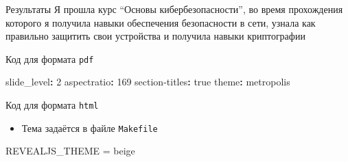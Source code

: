\documentclass[
  ignorenonframetext,
  aspectratio=169,
]{beamer}
\newenvironment{Shaded}{\begin{snugshade}}{\end{snugshade}}
\newcommand{\AttributeTok}[1]{\textcolor[rgb]{0.40,0.45,0.13}{#1}}
\newcommand{\CharTok}[1]{\textcolor[rgb]{0.13,0.47,0.30}{#1}}
\newcommand{\DecValTok}[1]{\textcolor[rgb]{0.68,0.00,0.00}{#1}}
\newcommand{\FunctionTok}[1]{\textcolor[rgb]{0.28,0.35,0.67}{#1}}
\newcommand{\KeywordTok}[1]{\textcolor[rgb]{0.00,0.23,0.31}{\textbf{#1}}}
\newcommand{\NormalTok}[1]{\textcolor[rgb]{0.00,0.23,0.31}{#1}}
\providecommand{\tightlist}{%
  \setlength{\itemsep}{0pt}\setlength{\parskip}{0pt}}\usepackage{longtable,booktabs,array}
\begin{document}
\begin{frame}{Результаты}
\label{ux440ux435ux437ux443ux43bux44cux442ux430ux442ux44b}
Я прошла курс \enquote{Основы кибербезопасности}, во время прохождения
которого я получила навыки обеспечения безопасности в сети, узнала как
правильно защитить свои устройства и получила навыки криптографии
\end{frame}

\begin{frame}[fragile]{Код для формата \texttt{pdf}}
\label{ux43aux43eux434-ux434ux43bux44f-ux444ux43eux440ux43cux430ux442ux430-pdf}
\begin{Shaded}
\begin{Highlighting}[]
\FunctionTok{slide\_level}\KeywordTok{:}\AttributeTok{ }\DecValTok{2}
\FunctionTok{aspectratio}\KeywordTok{:}\AttributeTok{ }\DecValTok{169}
\FunctionTok{section{-}titles}\KeywordTok{:}\AttributeTok{ }\CharTok{true}
\FunctionTok{theme}\KeywordTok{:}\AttributeTok{ metropolis}
\end{Highlighting}
\end{Shaded}
\end{frame}

\begin{frame}[fragile]{Код для формата \texttt{html}}
\label{ux43aux43eux434-ux434ux43bux44f-ux444ux43eux440ux43cux430ux442ux430-html}
\begin{itemize}[<+->]
\tightlist
\item
  Тема задаётся в файле \texttt{Makefile}
\end{itemize}

\begin{Shaded}
\begin{Highlighting}[]
\NormalTok{REVEALJS\_THEME = beige}
\end{Highlighting}
\end{Shaded}
\end{frame}
\end{document}
